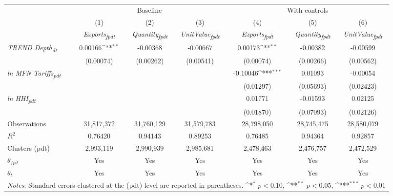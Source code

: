 {
\def\sym#1{\ifmmode^{#1}\else\(^{#1}\)\fi}
\begin{tabular}{l*{6}{c}}
\toprule
&\multicolumn{3}{c}{Baseline}&\multicolumn{3}{c}{With controls}\\\cmidrule(lr){2-4}\cmidrule(lr){5-7}
&(1)&(2)&(3)&(4)&(5)&(6)\\
&\textit{Exports\textsubscript{fpdt}}&\textit{Quantity\textsubscript{fpdt}}&\textit{UnitValue\textsubscript{fpdt}}&\textit{Exports\textsubscript{fpdt}}&\textit{Quantity\textsubscript{fpdt}}&\textit{UnitValue\textsubscript{fpdt}}\\
\midrule
\textit{TREND Depth\textsubscript{dt}} & 0.00166\sym{**} & -0.00368 & -0.00667 & 0.00173\sym{**} & -0.00382 & -0.00599\\
 & (0.00074) & (0.00262) & (0.00541) & (0.00074) & (0.00266) & (0.00562)\\
\addlinespace
\textit{ln MFN Tariffs\textsubscript{pdt}} &  &  &  & -0.10046\sym{***} & 0.01093 & -0.00054\\
 &  &  &  & (0.01297) & (0.05693) & (0.02423)\\
\addlinespace
\textit{ln HHI\textsubscript{pdt}} &  &  &  & 0.01771 & -0.01593 & 0.02125\\
 &  &  &  & (0.01870) & (0.07093) & (0.02126)\\
\midrule
Observations & 31,817,372 & 31,760,129 & 31,579,783 & 28,798,050 & 28,745,475 & 28,580,079\\
$R^{2}$ & 0.76420 & 0.94143 & 0.89253 & 0.76485 & 0.94364 & 0.92857\\
Clusters (pdt) & 2,993,119 & 2,990,939 & 2,985,681 & 2,478,463 & 2,476,757 & 2,472,529\\
$\theta_{fpd}$ & Yes & Yes & Yes & Yes & Yes & Yes\\
$\theta_{t}$ & Yes & Yes & Yes & Yes & Yes & Yes\\
\bottomrule
\multicolumn{7}{l}{\footnotesize \textit{Notes}: Standard errors clustered at the (pdt) level are reported in parentheses. \sym{*} \(p<0.10\), \sym{**} \(p<0.05\), \sym{***} \(p<0.01\)}\\
\end{tabular}
}
